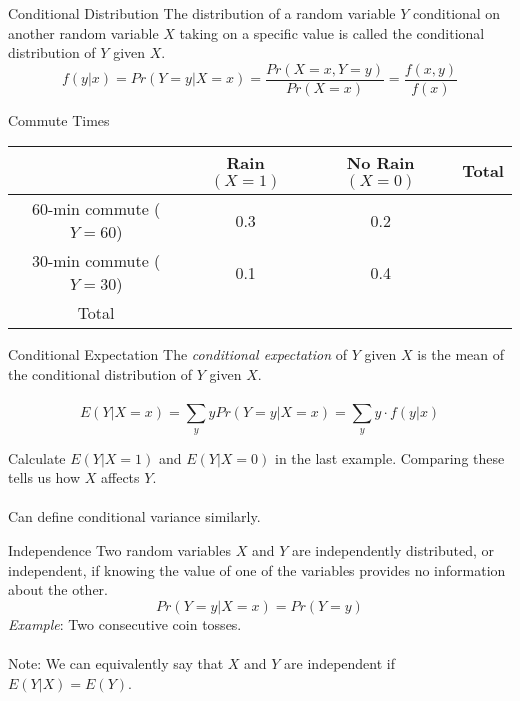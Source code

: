 \documentclass{./../div_teaching_slides}
\begin{document}
\begin{frame}{Conditional Distribution}
The distribution of a random variable $Y$ conditional on another random variable $X$ taking on a specific value is called the conditional
distribution of $Y$ given $X$.
$$ f(y|x) = Pr(Y=y| X=x) = \frac{Pr(X=x, Y=y)}{Pr(X=x)} = \frac{f(x,y)}{f(x)}   $$
\end{frame}

\begin{frame}{Commute Times}
 \small
\begin{center}
\begin{tabularx}{0.95\textwidth}{cccc}
\toprule
	& Rain $(X=1)$ & No Rain $(X=0)$ & Total \\
	\midrule
60-min commute ($Y=60$)  & 0.3  & 0.2 \\ 
30-min commute ($Y=30$) & 0.1 & 0.4 \\
\midrule
 Total & &  & \\
 \bottomrule
\end{tabularx} 
\end{center}
\vspace{6cm}
\end{frame}

\begin{frame}{Conditional Expectation}
The \textit{conditional expectation} of $Y$ given $X$ is the mean of the conditional distribution of $Y$ given $X$. \\~\\
$$ E(Y|X=x) = \sum_{y} y Pr(Y=y | X=x) = \sum_{y} y \cdot f(y|x) $$

\vspace{1em}
Calculate $E(Y| X=1)$ and $E(Y| X=0)$ in the last example. Comparing these tells us how $X$ affects $Y$. \\~\\
Can define conditional variance similarly. 
\end{frame}


\begin{frame}{Independence}
Two random variables $X$ and $Y$ are independently distributed, or independent, if knowing the value of one of the variables provides no information about the other.
$$ Pr(Y=y | X=x) = Pr(Y=y)  $$
\textit{Example}: Two consecutive coin tosses. \\~\\
Note: We can equivalently say that $X$ and $Y$ are independent if $E(Y|X) = E(Y)$.
\end{frame}
\end{document}
